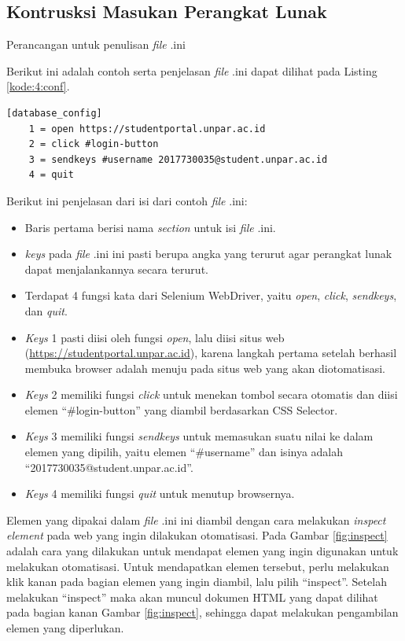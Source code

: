 \subsection{Kontrusksi Masukan Perangkat Lunak}
Perancangan untuk penulisan \textit{file} .ini 

Berikut ini adalah contoh serta penjelasan \textit{file} .ini dapat dilihat pada Listing \ref{kode:4:conf}.
\begin{lstlisting}[caption=Contoh \textit{file} .ini untuk Masukan Perangkat Lunak Perekaman Kehadiran Daring Otomatis, label=kode:4:conf]
	[database_config]
	1 = open https://studentportal.unpar.ac.id
	2 = click #login-button
	3 = sendkeys #username 2017730035@student.unpar.ac.id 
	4 = quit
\end{lstlisting}
Berikut ini penjelasan dari isi dari contoh \textit{file} .ini:
\begin{itemize}
	\item Baris pertama berisi nama \textit{section} untuk isi \textit{file} .ini.
	\item \textit{keys} pada \textit{file} .ini ini pasti berupa angka yang terurut agar perangkat lunak dapat menjalankannya secara terurut.
	\item Terdapat 4 fungsi kata dari Selenium WebDriver, yaitu \textit{open}, \textit{click}, \textit{sendkeys}, dan \textit{quit}.
	\item \textit{Keys} 1 pasti diisi oleh fungsi \textit{open}, lalu diisi situs web (\url{https://studentportal.unpar.ac.id}), karena langkah pertama setelah berhasil membuka browser adalah menuju pada situs web yang akan diotomatisasi.
	\item \textit{Keys} 2 memiliki fungsi \textit{click} untuk menekan tombol secara otomatis dan diisi elemen ``\#login-button'' yang diambil berdasarkan CSS Selector.
	\item \textit{Keys} 3 memiliki fungsi \textit{sendkeys} untuk memasukan suatu nilai ke dalam elemen yang dipilih, yaitu elemen ``\#username'' dan isinya adalah ``2017730035@student.unpar.ac.id''.
	\item \textit{Keys} 4 memiliki fungsi \textit{quit} untuk menutup browsernya.
\end{itemize}
Elemen yang dipakai dalam \textit{file} .ini ini diambil dengan cara melakukan \textit{inspect element} pada web yang ingin dilakukan otomatisasi. Pada Gambar \ref{fig:inspect} adalah cara yang dilakukan untuk mendapat elemen yang ingin digunakan untuk melakukan otomatisasi. Untuk mendapatkan elemen tersebut, perlu melakukan klik kanan pada bagian elemen yang ingin diambil, lalu pilih ``inspect''. Setelah melakukan ``inspect'' maka akan muncul dokumen HTML yang dapat dilihat pada bagian kanan Gambar \ref{fig:inspect}, sehingga dapat melakukan pengambilan elemen yang diperlukan.
